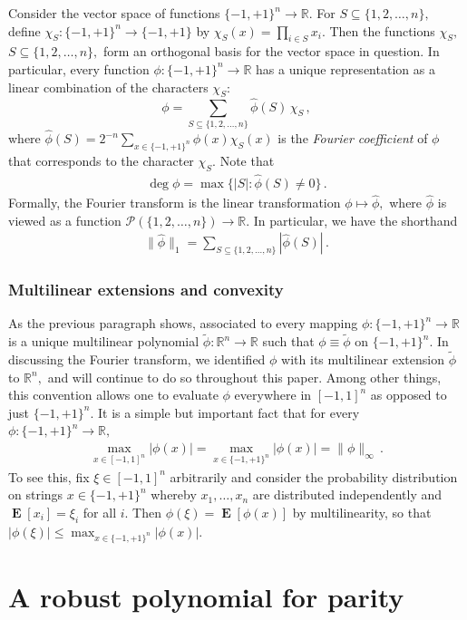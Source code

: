 \documentclass[10pt]{article}
\theoremstyle{definition}
\numberwithin{equation}{section}
\newcommand{\R}{{\mathbb R}}
\newcommand{\moo}{\{-1,+1\}}
\newcommand{\moon}{\moo^n}
\newcommand{\oneton}{\{1,2,\dots,n\}}
\DeclareMathOperator*{\Exp}{\mathbf{E}}
\begin{document}
Consider the vector space of functions
$\moon\to\R$. For $S\subseteq\oneton,$ define
$\chi_S\colon\moon\to\moo$ by $\chi_S(x) =\prod_{i\in
S} x_i$. Then the functions $\chi_S,$
$S\subseteq\oneton,$ form an orthogonal basis for the
vector space in question.  In particular, every
function $\phi\colon\moon\to\R$ has a unique
representation as a linear combination of the
characters $\chi_S$: 
\[\phi=\sum_{S\subseteq\oneton} \hat \phi(S)\,\chi_S\,,\]
where $\hat\phi(S)=2^{-n}\sum_{x\in\moon}
\phi(x)\chi_S(x)$ is the \emph{Fourier coefficient} of
$\phi$ that corresponds to the character $\chi_S$. 
Note that 
\begin{align*}
\deg \phi= \max\{|S|:\hat \phi(S)\ne 0\}\,.
\end{align*}
Formally, the Fourier transform is the linear
transformation $\phi\mapsto\hat\phi,$ where $\hat\phi$ 
is viewed as a function 
$\mathcal{P}(\oneton)\to\R$. In particular, we have
the shorthand
\begin{align*}
\|\hat\phi\|_1=\sum_{S\subseteq\oneton}|\hat\phi(S)|\,.
\end{align*}

\subsubsection*{Multilinear extensions and convexity}

As the previous paragraph shows, associated to every mapping 
$\phi\colon\moon\to\R$ is a unique
multilinear polynomial $\tilde
\phi\colon\R^n\to\R$ 
such that $\phi\equiv \tilde \phi$ on
$\moon$. In discussing the Fourier transform, we
identified $\phi$ with its
multilinear extension $\tilde \phi$ to $\R^n,$ and 
will continue to do so throughout this paper. Among
other things, this
convention allows one to evaluate $\phi$ everywhere
in $[-1,1]^n$ as opposed to just $\moon$. 
It is a simple but important fact that for every
$\phi\colon\moon\to\R,$ 
\begin{align*}
\max_{x\in[-1,1]^n}|\phi(x)|
=\max_{x\in\moon}|\phi(x)| = \|\phi\|_\infty\,.
\end{align*}
To see this, fix $\xi\in[-1,1]^n$ arbitrarily and
consider the probability distribution on strings $x\in\moon$
whereby $x_1,\dots,x_n$ are distributed independently and
$\Exp[x_i]=\xi_i$  for all $i$. Then
$\phi(\xi)=\Exp[\phi(x)]$ by multilinearity, so that
$|\phi(\xi)|\leq\max_{x\in\moon}|\phi(x)|$.

\section{A robust polynomial for parity}
\label{sec:robust-parity}
\end{document}
